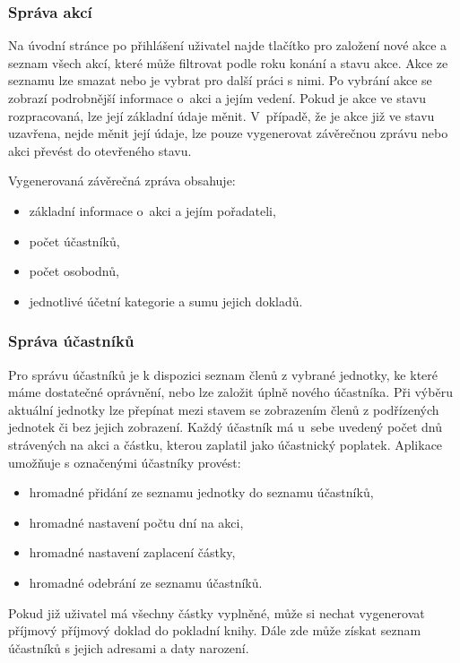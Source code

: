 \documentclass[thesis=B,czech]{FITthesis}[2011/06/14]
\begin{document}
\subsubsection{Správa akcí}
Na úvodní stránce po přihlášení uživatel najde tlačítko pro založení nové akce a seznam všech akcí, které může filtrovat podle roku konání a stavu akce. Akce ze seznamu lze smazat nebo je vybrat pro další práci s nimi. Po vybrání akce se zobrazí podrobnější informace o~akci a jejím vedení. Pokud je akce ve stavu rozpracovaná, lze její základní údaje měnit. V~případě, že je akce již ve stavu uzavřena, nejde měnit její údaje, lze pouze vygenerovat závěrečnou zprávu nebo akci převést do otevřeného stavu.

Vygenerovaná závěrečná zpráva obsahuje:
\begin{itemize}
	\item základní informace o~akci a jejím pořadateli,
	\item počet účastníků,
	\item počet osobodnů,
	\item jednotlivé účetní kategorie a sumu jejich dokladů.
\end{itemize}

\subsubsection{Správa účastníků}
Pro správu účastníků je k dispozici seznam členů z vybrané jednotky, ke které máme dostatečné oprávnění, nebo lze založit úplně nového účastníka. Při výběru aktuální jednotky lze přepínat mezi stavem se zobrazením členů z podřízených jednotek či bez jejich zobrazení. Každý účastník má u~sebe uvedený počet dnů strávených na akci a částku, kterou zaplatil jako účastnický poplatek.
Aplikace umožňuje s označenými účastníky provést:
\begin{itemize}
	\item hromadné přidání ze seznamu jednotky do seznamu účastníků,
	\item hromadné nastavení počtu dní na akci,
	\item hromadné nastavení zaplacení částky, 
	\item hromadné odebrání ze seznamu účastníků.
\end{itemize}
  
Pokud již uživatel má všechny částky vyplněné, může si nechat vygenerovat příjmový příjmový doklad do pokladní knihy. Dále zde může získat seznam účastníků s jejich adresami a daty narození.
\end{document}
